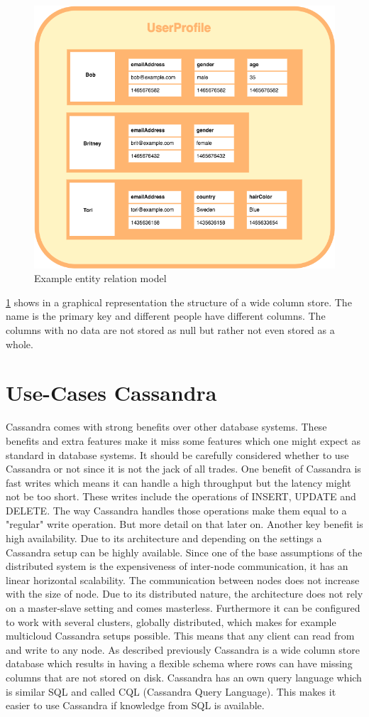 \begin{figure}[H]
    \centering
    \includegraphics[width=0.75\columnwidth]{img/wide_column_store.png}
    \caption{Example entity relation model \autocite{wideColumnGraphic}}
    \label{fig:cassandra:wide_column}
\end{figure}

\ref{fig:cassandra:wide_column} shows in a graphical representation the structure of a wide column store. The name is the primary key and different people have different columns. The columns with no data are not stored as null but rather not even stored as a whole. 

\section{Use-Cases Cassandra}
Cassandra comes with strong benefits over other database systems. These benefits and extra features make it miss some features which one might expect as standard in database systems.
It should be carefully considered whether to use Cassandra or not since it is not the jack of all trades.
One benefit of Cassandra is fast writes which means it can handle a high throughput but the latency might not be too short. These writes include the operations of {INSERT}, {UPDATE} and {DELETE}.
The way Cassandra handles those operations make them equal to a "regular" write operation. But more detail on that later on. Another key benefit is high availability. Due to its architecture and depending on the settings a Cassandra setup can be highly available. Since one of the base assumptions of the distributed system is the expensiveness of inter-node communication, it has an linear horizontal scalability.
The communication between nodes does not increase with the size of node. Due to its distributed nature, the architecture does not rely on a master-slave setting and comes masterless.
Furthermore it can be configured to work with several clusters, globally distributed, which makes for example multicloud Cassandra setups possible.
This means that any client can read from and write to any node. As described previously Cassandra is a wide column store database which results in having a flexible schema where rows can have missing columns that are not stored on disk.
Cassandra has an own query language which is similar SQL and called CQL (Cassandra Query Language). This makes it easier to use Cassandra if knowledge from SQL is available.

